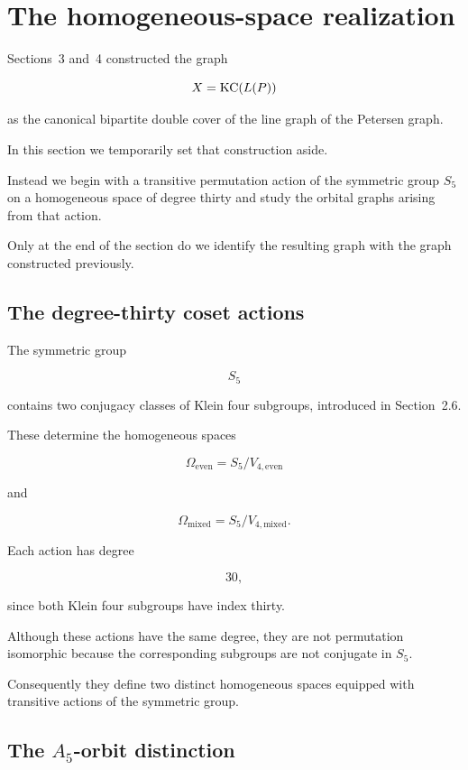 \section{The homogeneous-space realization}

Sections~3 and~4 constructed the graph

\[
X=\operatorname{KC}(L(P))
\]

as the canonical bipartite double cover of the line graph of the Petersen
graph.

In this section we temporarily set that construction aside.

Instead we begin with a transitive permutation action of the symmetric
group \(S_{5}\) on a homogeneous space of degree thirty and study the
orbital graphs arising from that action.

Only at the end of the section do we identify the resulting graph with the
graph constructed previously.

\subsection{The degree-thirty coset actions}

The symmetric group

\[
S_{5}
\]

contains two conjugacy classes of Klein four subgroups, introduced in
Section~2.6.

These determine the homogeneous spaces

\[
\Omega_{\mathrm{even}}
=
S_{5}/V_{4,\mathrm{even}}
\]

and

\[
\Omega_{\mathrm{mixed}}
=
S_{5}/V_{4,\mathrm{mixed}}.
\]

Each action has degree

\[
30,
\]

since both Klein four subgroups have index thirty.

Although these actions have the same degree, they are not permutation
isomorphic because the corresponding subgroups are not conjugate in
\(S_{5}\).

Consequently they define two distinct homogeneous spaces equipped with
transitive actions of the symmetric group.



\subsection{The \(A_{5}\)-orbit distinction}

